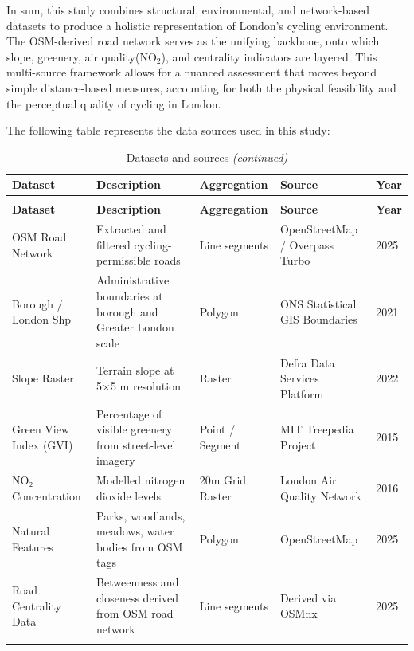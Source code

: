 \documentclass[
  12pt,
  oneside]{book}
\begin{document}
In sum, this study combines structural, environmental, and network-based datasets to produce a holistic representation of London's cycling environment. The OSM-derived road network serves as the unifying backbone, onto which slope, greenery, air quality(NO\(_2\)), and centrality indicators are layered. This multi-source framework allows for a nuanced assessment that moves beyond simple distance-based measures, accounting for both the physical feasibility and the perceptual quality of cycling in London.

The following table represents the data sources used in this study:

\begingroup\fontsize{9}{11}\selectfont

\begin{longtable}[t]{>{\raggedright\arraybackslash}p{2.0cm}>{\raggedright\arraybackslash}p{5.0cm}>{\raggedright\arraybackslash}p{2.2cm}>{\raggedright\arraybackslash}p{2.2cm}l}
\caption{\label{tab:datasource}Datasets and sources}\\
\toprule
\textbf{Dataset} & \textbf{Description} & \textbf{Aggregation} & \textbf{Source} & \textbf{Year}\\
\midrule
\endfirsthead
\caption[]{\label{tab:datasource}Datasets and sources \textit{(continued)}}\\
\toprule
\textbf{Dataset} & \textbf{Description} & \textbf{Aggregation} & \textbf{Source} & \textbf{Year}\\
\midrule
\endhead

\endfoot
\bottomrule
\endlastfoot
OSM Road Network & Extracted and filtered cycling-permissible roads & Line segments & OpenStreetMap / Overpass Turbo & 2025\\
Borough / London Shp & Administrative boundaries at borough and Greater London scale & Polygon & ONS Statistical GIS Boundaries & 2021\\
Slope Raster & Terrain slope at 5×5 m resolution & Raster & Defra Data Services Platform & 2022\\
Green View Index (GVI) & Percentage of visible greenery from street-level imagery & Point / Segment & MIT Treepedia Project & 2015\\
NO₂ Concentration & Modelled nitrogen dioxide levels & 20m Grid Raster & London Air Quality Network & 2016\\
\addlinespace
Natural Features & Parks, woodlands, meadows, water bodies from OSM tags & Polygon & OpenStreetMap & 2025\\
Road Centrality Data & Betweenness and closeness derived from OSM road network & Line segments & Derived via OSMnx & 2025\\*
\end{longtable}
\endgroup{}
\end{document}
